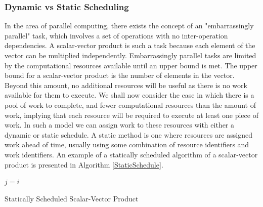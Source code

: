 \documentclass[12pt]{article}
\begin{document}
\subsubsection{Dynamic vs Static Scheduling}
In the area of parallel computing, there exists the concept of an "embarrassingly parallel" task, which involves a set of operations with no inter-operation dependencies. A scalar-vector product is such a task because each element of the vector can be multiplied independently. Embarrassingly parallel tasks are limited by the computational resources available until an upper bound is met. The upper bound for a scalar-vector product is the number of elements in the vector. Beyond this amount, no additional resources will be useful as there is no work available for them to execute.
\newline
We shall now consider the case in which there is a pool of work to complete, and fewer computational resources than the amount of work, implying that each resource will be required to execute at least one piece of work. In such a model we can assign work to these resources with either a dynamic or static schedule.
\newline
A static method is one where resources are assigned work ahead of time, usually using some combination of resource identifiers and work identifiers. An example of a statically scheduled algorithm of a scalar-vector product is presented in Algorithm \ref{StaticSchedule}.

\IncMargin{1em}
\begin{algorithm}[H]
 \BlankLine
 
 $j = i$\;
 \caption{Statically Scheduled Scalar-Vector Product}
 \label{StaticSchedule}
\end{algorithm}
\DecMargin{1em}
\medskip
\end{document}
